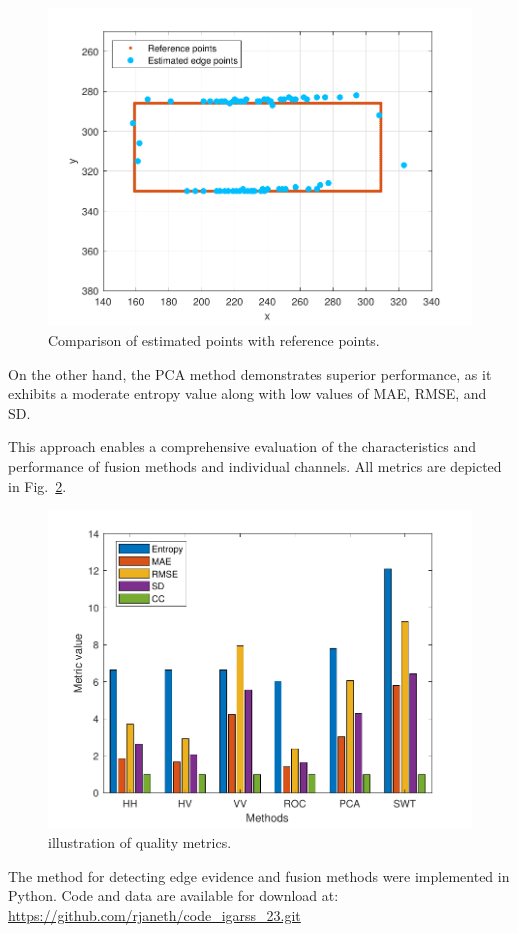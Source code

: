 \documentclass{article}
\begin{document}
\begin{figure}[H] %
	\includegraphics[scale=0.55]{figures/roc_f.pdf}\vspace{-1.5mm} 
	\caption{Comparison of estimated points with reference points.}
	\label{F4}
\end{figure}
On the other hand, the PCA method demonstrates superior performance, as it exhibits a moderate entropy value along with low values of MAE, RMSE, and SD.

This approach enables a comprehensive evaluation of the characteristics and performance of fusion methods and individual channels. All metrics are depicted in Fig.~\ref{F5}. \vspace{-0.3cm}
\begin{figure}[H] 
	\includegraphics[scale=0.55]{figures/metricas.pdf}\vspace{-3.5mm} 
	\caption{illustration of quality metrics.}\vspace{-0.3cm}
	\label{F5}
\end{figure}%
The method for detecting edge evidence  and fusion methods were implemented in Python. Code and data are available for download at:  \url{ https://github.com/rjaneth/code_igarss_23.git}
\vspace{-0.3cm}
\end{document}
